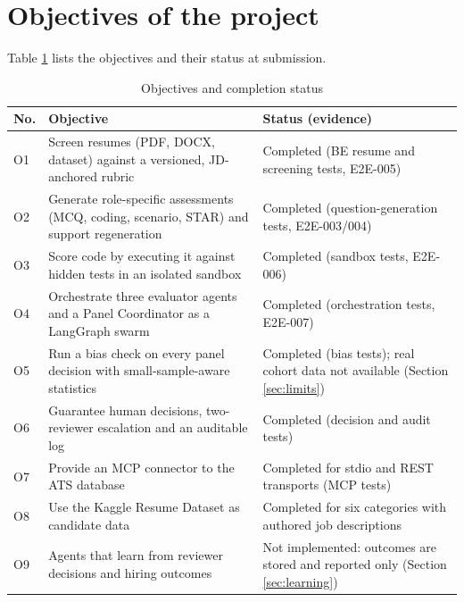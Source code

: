 \section{Objectives of the project}
\justify
Table \ref{tab:objectives} lists the objectives and their status at submission.

\begin{table}[H]\centering\small
\caption{Objectives and completion status}\label{tab:objectives}
\begin{tabular}{|p{0.6cm}|p{8.6cm}|p{4.6cm}|}\hline
\textbf{No.} & \textbf{Objective} & \textbf{Status (evidence)}\\ \hline
O1 & Screen resumes (PDF, DOCX, dataset) against a versioned, JD-anchored rubric & Completed (BE resume and screening tests, E2E-005)\\ \hline
O2 & Generate role-specific assessments (MCQ, coding, scenario, STAR) and support regeneration & Completed (question-generation tests, E2E-003/004)\\ \hline
O3 & Score code by executing it against hidden tests in an isolated sandbox & Completed (sandbox tests, E2E-006)\\ \hline
O4 & Orchestrate three evaluator agents and a Panel Coordinator as a LangGraph swarm & Completed (orchestration tests, E2E-007)\\ \hline
O5 & Run a bias check on every panel decision with small-sample-aware statistics & Completed (bias tests); real cohort data not available (Section \ref{sec:limits})\\ \hline
O6 & Guarantee human decisions, two-reviewer escalation and an auditable log & Completed (decision and audit tests)\\ \hline
O7 & Provide an MCP connector to the ATS database & Completed for stdio and REST transports (MCP tests)\\ \hline
O8 & Use the Kaggle Resume Dataset as candidate data & Completed for six categories with authored job descriptions\\ \hline
O9 & Agents that learn from reviewer decisions and hiring outcomes & Not implemented: outcomes are stored and reported only (Section \ref{sec:learning})\\ \hline
\end{tabular}
\end{table}

